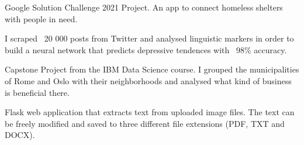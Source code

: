 \documentclass[]{deedy-resume-openfont}
\begin{document}
\begin{minipage}[t]{0.48\textwidth}
Google Solution Challenge 2021 Project. An app to connect homeless shelters with people in need.
\sectionsep





I scraped ~20 000 posts from Twitter and analysed linguistic markers in order to build a neural network that predicts depressive tendences with ~98\% accuracy.
\sectionsep

Capstone Project from the IBM Data Science course. 
\newline
I grouped the municipalities of Rome and Oslo with their neighborhoods and analysed what kind of business is beneficial there.
\sectionsep



Flask web application that extracts text from uploaded image files. The text can be freely modified and saved to three different file extensions (PDF, TXT and DOCX).
\sectionsep


\end{minipage} 
\end{document}
